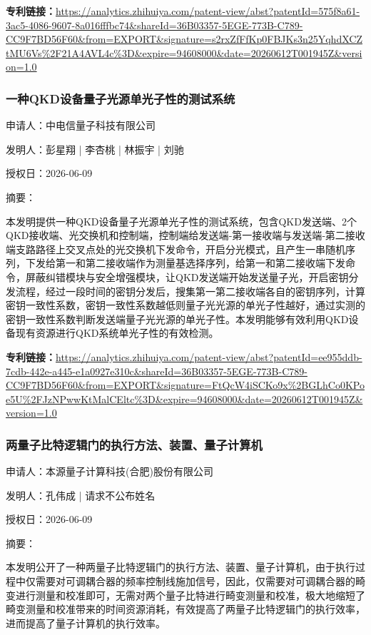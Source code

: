 \documentclass[12pt,a4paper]{ctexart}
\begin{document}
\noindent\textbf{专利链接：}\url{https://analytics.zhihuiya.com/patent-view/abst?patentId=575f8a61-3ac5-4086-9607-8a016fffbc74&shareId=36B03357-5EGE-773B-C789-CC9F7BD56F60&from=EXPORT&signature=s2rxZfFfKp0FBJKs3n25YqhdXCZtMU6Vs%2F21A4AVL4c%3D&expire=94608000&date=20260612T001945Z&version=1.0}

\subsubsection{ 一种QKD设备量子光源单光子性的测试系统 }

申请人：中电信量子科技有限公司

发明人：彭星翔 | 李杏桃 | 林振宇 | 刘驰

授权日：2026-06-09

摘要：

本发明提供一种QKD设备量子光源单光子性的测试系统，包含QKD发送端、2个QKD接收端、光交换机和控制端，控制端给发送端‑第一接收端与发送端‑第二接收端支路路径上交叉点处的光交换机下发命令，开启分光模式，且产生一串随机序列，下发给第一和第二接收端作为测量基选择序列，给第一和第二接收端下发命令，屏蔽纠错模块与安全增强模块，让QKD发送端开始发送量子光，开启密钥分发流程，经过一段时间的密钥分发后，搜集第一第二接收端各自的密钥序列，计算密钥一致性系数，密钥一致性系数越低则量子光光源的单光子性越好，通过实测的密钥一致性系数判断发送端量子光光源的单光子性。本发明能够有效利用QKD设备现有资源进行QKD系统单光子性的有效检测。

\noindent\textbf{专利链接：}\url{https://analytics.zhihuiya.com/patent-view/abst?patentId=ee955ddb-7cdb-442e-a445-e1a0927e310c&shareId=36B03357-5EGE-773B-C789-CC9F7BD56F60&from=EXPORT&signature=FtQcW4iSCKo9x%2BGLhCo0KPoe5U%2FJzNPwwKtMalCEltc%3D&expire=94608000&date=20260612T001945Z&version=1.0}

\subsubsection{ 两量子比特逻辑门的执行方法、装置、量子计算机 }

申请人：本源量子计算科技(合肥)股份有限公司

发明人：孔伟成 | 请求不公布姓名

授权日：2026-06-09

摘要：

本发明公开了一种两量子比特逻辑门的执行方法、装置、量子计算机，由于执行过程中仅需要对可调耦合器的频率控制线施加信号，因此，仅需要对可调耦合器的畸变进行测量和校准即可，无需对两个量子比特进行畸变测量和校准，极大地缩短了畸变测量和校准带来的时间资源消耗，有效提高了两量子比特逻辑门的执行效率，进而提高了量子计算机的执行效率。
\end{document}
